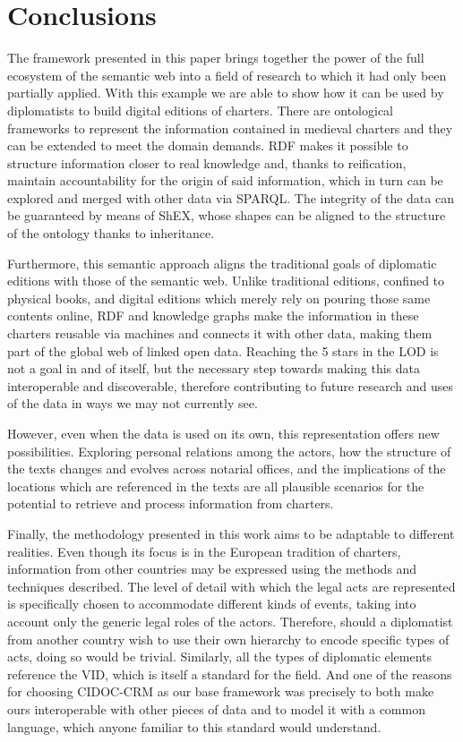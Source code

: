 \documentclass{article}
\begin{document}
\section{Conclusions}
\label{conclusions}

The framework presented in this paper brings together the power of the full ecosystem of the semantic web into a field of research to which it had only been partially applied.
With this example we are able to show how it can be used by diplomatists to build digital editions of charters.
There are ontological frameworks to represent the information contained in medieval charters and they can be extended to meet the domain demands.
RDF makes it possible to structure information closer to real knowledge and, thanks to reification, maintain accountability for the origin of said information, which in turn can be explored and merged with other data via SPARQL.
The integrity of the data can be guaranteed by means of ShEX, whose shapes can be aligned to the structure of the ontology thanks to inheritance.

Furthermore, this semantic approach aligns the traditional goals of diplomatic editions with those of the semantic web.
Unlike traditional editions, confined to physical books, and digital editions which merely rely on pouring those same contents online, RDF and knowledge graphs make the information in these charters reusable via machines and connects it with other data, making them part of the global web of linked open data.
Reaching the 5 stars in the LOD is not a goal in and of itself, but the necessary step towards making this data interoperable and discoverable, therefore contributing to future research and uses of the data in ways we may not currently see.

However, even when the data is used on its own, this representation offers new possibilities.
Exploring personal relations among the actors, how the structure of the texts changes and evolves across notarial offices, and the implications of the locations which are referenced in the texts are all plausible scenarios for the potential to retrieve and process information from charters.

Finally, the methodology presented in this work aims to be adaptable to different realities.
Even though its focus is in the European tradition of charters, information from other countries may be expressed using the methods and techniques described.
The level of detail with which the legal acts are represented is specifically chosen to accommodate different kinds of events, taking into account only the generic legal roles of the actors.
Therefore, should a diplomatist from another country wish to use their own hierarchy to encode specific types of acts, doing so would be trivial.
Similarly, all the types of diplomatic elements reference the VID, which is itself a standard for the field.
And one of the reasons for choosing CIDOC-CRM as our base framework was precisely to both make ours interoperable with other pieces of data and to model it with a common language, which anyone familiar to this standard would understand.
\end{document}
